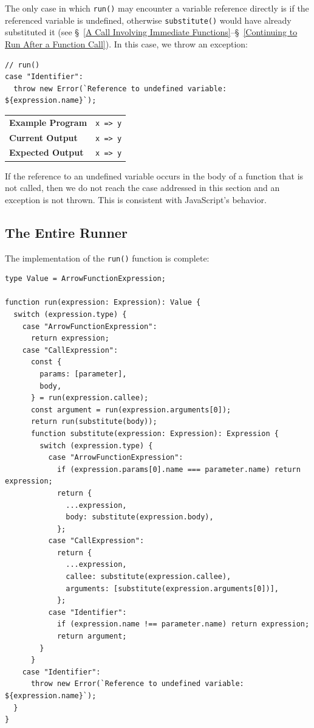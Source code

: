 \documentclass[12pt, oneside]{book}
\begin{document}
The only case in which \texttt{run()} may encounter a variable reference directly is if the referenced variable is undefined, otherwise \texttt{substitute()} would have already substituted it (see §~\ref{A Call Involving Immediate Functions}–§~\ref{Continuing to Run After a Function Call}). In this case, we throw an exception:

\begin{verbatim}
// run()
case "Identifier":
  throw new Error(`Reference to undefined variable: ${expression.name}`);
\end{verbatim}

\begin{center}
\begin{tabular}{ll}
\textbf{Example Program} & \texttt{x => y} \\
\textbf{Current Output} & \texttt{x => y} \\
\textbf{Expected Output} & \texttt{x => y} \\
\end{tabular}
\end{center}

If the reference to an undefined variable occurs in the body of a function that is not called, then we do not reach the case addressed in this section and an exception is not thrown. This is consistent with JavaScript’s behavior.

\subsection{The Entire Runner}
\label{Step 0: The Entire Runner}

The implementation of the \texttt{run()} function is complete:

\begin{verbatim}
type Value = ArrowFunctionExpression;

function run(expression: Expression): Value {
  switch (expression.type) {
    case "ArrowFunctionExpression":
      return expression;
    case "CallExpression":
      const {
        params: [parameter],
        body,
      } = run(expression.callee);
      const argument = run(expression.arguments[0]);
      return run(substitute(body));
      function substitute(expression: Expression): Expression {
        switch (expression.type) {
          case "ArrowFunctionExpression":
            if (expression.params[0].name === parameter.name) return expression;
            return {
              ...expression,
              body: substitute(expression.body),
            };
          case "CallExpression":
            return {
              ...expression,
              callee: substitute(expression.callee),
              arguments: [substitute(expression.arguments[0])],
            };
          case "Identifier":
            if (expression.name !== parameter.name) return expression;
            return argument;
        }
      }
    case "Identifier":
      throw new Error(`Reference to undefined variable: ${expression.name}`);
  }
}
\end{verbatim}
\end{document}
